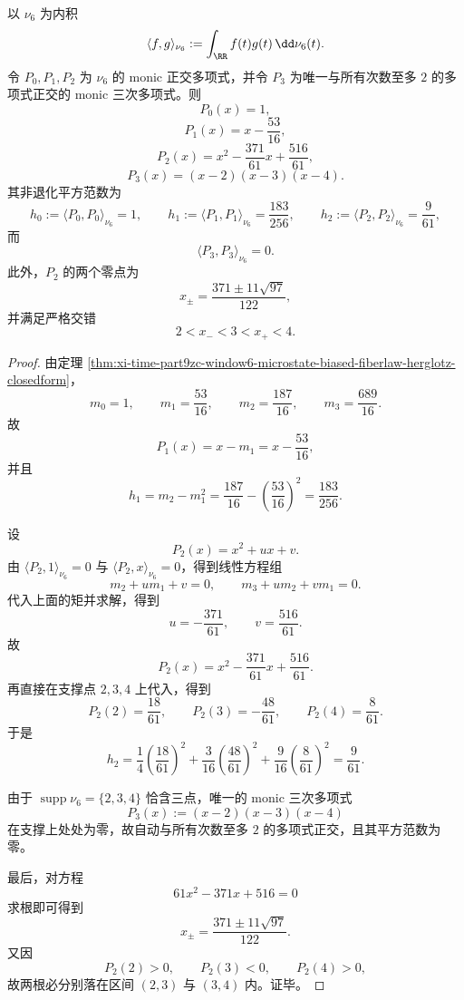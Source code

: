 \begin{theorem}\label{thm:xi-time-part9zc-window6-orthogonal-polynomials-cubic-termination}
以 \(\nu_6\) 为内积
\[
\langle f,g\rangle_{\nu_6}:=\int_{\RR}f(t)g(t)\,\dd\nu_6(t).
\]
令 \(P_0,P_1,P_2\) 为 \(\nu_6\) 的 monic 正交多项式，并令 \(P_3\) 为唯一与所有次数至多 \(2\) 的多项式正交的 monic 三次多项式。则
\[
P_0(x)=1,
\]
\[
P_1(x)=x-\frac{53}{16},
\]
\[
P_2(x)=x^2-\frac{371}{61}x+\frac{516}{61},
\]
\[
P_3(x)=(x-2)(x-3)(x-4).
\]
其非退化平方范数为
\[
h_0:=\langle P_0,P_0\rangle_{\nu_6}=1,\qquad
h_1:=\langle P_1,P_1\rangle_{\nu_6}=\frac{183}{256},
\qquad
h_2:=\langle P_2,P_2\rangle_{\nu_6}=\frac9{61},
\]
而
\[
\langle P_3,P_3\rangle_{\nu_6}=0.
\]
此外，\(P_2\) 的两个零点为
\[
x_{\pm}=\frac{371\pm 11\sqrt{97}}{122},
\]
并满足严格交错
\[
2<x_-<3<x_+<4.
\]
\end{theorem}
\begin{proof}
由定理 \ref{thm:xi-time-part9zc-window6-microstate-biased-fiberlaw-herglotz-closedform}，
\[
m_0=1,\qquad
m_1=\frac{53}{16},\qquad
m_2=\frac{187}{16},\qquad
m_3=\frac{689}{16}.
\]
故
\[
P_1(x)=x-m_1=x-\frac{53}{16},
\]
并且
\[
h_1=m_2-m_1^2=\frac{187}{16}-\left(\frac{53}{16}\right)^2=\frac{183}{256}.
\]

设
\[
P_2(x)=x^2+ux+v.
\]
由 \(\langle P_2,1\rangle_{\nu_6}=0\) 与 \(\langle P_2,x\rangle_{\nu_6}=0\)，得到线性方程组
\[
m_2+u m_1+v=0,
\qquad
m_3+u m_2+v m_1=0.
\]
代入上面的矩并求解，得到
\[
u=-\frac{371}{61},
\qquad
v=\frac{516}{61}.
\]
故
\[
P_2(x)=x^2-\frac{371}{61}x+\frac{516}{61}.
\]
再直接在支撑点 \(2,3,4\) 上代入，得到
\[
P_2(2)=\frac{18}{61},\qquad
P_2(3)=-\frac{48}{61},\qquad
P_2(4)=\frac8{61}.
\]
于是
\[
h_2
=
\frac14\left(\frac{18}{61}\right)^2
+
\frac3{16}\left(\frac{48}{61}\right)^2
+
\frac9{16}\left(\frac8{61}\right)^2
=\frac9{61}.
\]

由于 \(\operatorname{supp}\nu_6=\{2,3,4\}\) 恰含三点，唯一的 monic 三次多项式
\[
P_3(x):=(x-2)(x-3)(x-4)
\]
在支撑上处处为零，故自动与所有次数至多 \(2\) 的多项式正交，且其平方范数为零。

最后，对方程
\[
61x^2-371x+516=0
\]
求根即可得到
\[
x_{\pm}=\frac{371\pm 11\sqrt{97}}{122}.
\]
又因
\[
P_2(2)>0,\qquad P_2(3)<0,\qquad P_2(4)>0,
\]
故两根必分别落在区间 \((2,3)\) 与 \((3,4)\) 内。证毕。
\end{proof}

